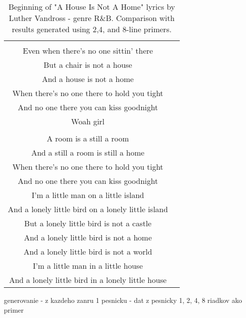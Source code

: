 \begin{table}
\begin{tabular}{cc}
\begin{minipage}[t]{0.47\textwidth}
	 \end{minipage}
	 & 
	 \begin{minipage}[t]{0.47\textwidth}
	 A chair is still a chair\\
	 Even when there's no one sittin' there\\
	 But a chair is not a house\\
	 And a house is not a home\\
	 When there's no one there to hold you tight\\
	 And no one there you can kiss goodnight\\
	 Woah girl\\
	 \\
	 A room is a still a room\\
	 \color{blue} And a still a room is still a home\\
	 When there's no one there to hold you tight\\
	 And no one there you can kiss goodnight\\
	 I'm a little man on a little island\\
	 And a lonely little bird on a lonely little island\\	 
	 But a lonely little bird is not a castle\\
	 And a lonely little bird is not a home\\
	 And a lonely little bird is not a world\\
	 I'm a little man in a little house\\
	 And a lonely little bird in a lonely little house
	 \end{minipage}\\[6pt]
	\end{tabular}
	\caption{Beginning of "A House Is Not A Home" lyrics by Luther Vandross - genre R\&B. Comparison with results generated using 2,4, and 8-line primers.}
\end{table}



 generovanie
-  z kazdeho zanru 1 pesnicku
- dat z pesnicky 1, 2, 4, 8 riadkov ako primer
